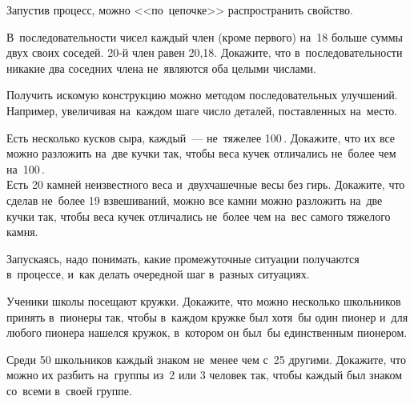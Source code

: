 



Запустив процесс, можно <<по~цепочке>> распространить свойство.

\begin{exercises}

\item
В~последовательности чисел каждый член (кроме первого) на~18 больше суммы
двух своих соседей.
20-й член равен 20,18.
Докажите, что в~последовательности никакие два соседних члена не~являются оба
целыми числами.

\end{exercises}

Получить искомую конструкцию можно методом последовательных улучшений.
Например, увеличивая на~каждом шаге число деталей, поставленных на~место.

\begin{exercises}

\item
\subproblem
Есть несколько кусков сыра, каждый~--- не~тяжелее 100\,.
Докажите, что их все можно разложить на~две кучки так, чтобы веса кучек
отличались не~более чем на~100\,.
\\
\subproblem
Есть 20 камней неизвестного веса и~двухчашечные весы без гирь.
Докажите, что сделав не~более 19 взвешиваний, можно все камни можно разложить
на~две кучки так, чтобы веса кучек отличались не~более чем на~вес самого
тяжелого камня.

\end{exercises}

Запускаясь, надо понимать, какие промежуточные ситуации получаются в~процессе,
и~как делать очередной шаг в~разных ситуациях.

\begin{exercises}

\item
Ученики школы посещают кружки.
Докажите, что можно несколько школьников принять в~пионеры так, чтобы в~каждом
кружке был хотя~бы один пионер и~для любого пионера нашелся кружок, в~котором
он был~бы единственным пионером.

\item
Среди 50 школьников каждый знаком не~менее чем с~25 другими.
Докажите, что можно их разбить на~группы из~2 или 3 человек так, чтобы каждый
был знаком со~всеми в~своей группе.

\end{exercises}

